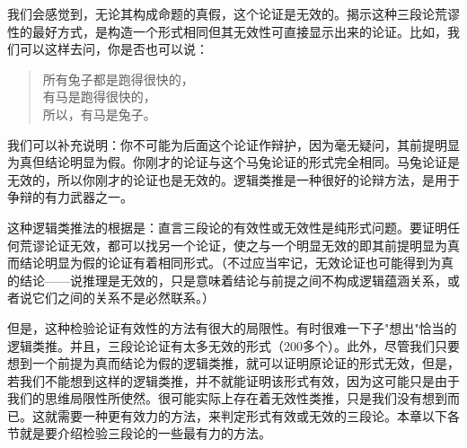 我们会感觉到，无论其构成命题的真假，这个论证是无效的。揭示这种三段论荒谬性的最好方式，是构造一个形式相同但其无效性可直接显示出来的论证。比如，我们可以这样去问，你是否也可以说：

\begin{quote}
所有兔子都是跑得很快的，\\
有马是跑得很快的，\\
所以，有马是兔子。
\end{quote}

我们可以补充说明：你不可能为后面这个论证作辩护，因为毫无疑问，其前提明显为真但结论明显为假。你刚才的论证与这个马兔论证的形式完全相同。马兔论证是无效的，所以你刚才的论证也是无效的。逻辑类推是一种很好的论辩方法，是用于争辩的有力武器之一。

这种逻辑类推法的根据是：直言三段论的有效性或无效性是纯形式问题。要证明任何荒谬论证无效，都可以找另一个论证，使之与一个明显无效的即其前提明显为真而结论明显为假的论证有着相同形式。（不过应当牢记，无效论证也可能得到为真的结论——说推理是无效的，只是意味着结论与前提之间不构成逻辑蕴涵关系，或者说它们之间的关系不是必然联系。）

但是，这种检验论证有效性的方法有很大的局限性。有时很难一下子"想出"恰当的逻辑类推。并且，三段论论证有太多无效的形式（200多个）。此外，尽管我们只要想到一个前提为真而结论为假的逻辑类推，就可以证明原论证的形式无效，但是，若我们不能想到这样的逻辑类推，并不就能证明该形式有效，因为这可能只是由于我们的思维局限性所使然。很可能实际上存在着无效性类推，只是我们没有想到而已。这就需要一种更有效力的方法，来判定形式有效或无效的三段论。本章以下各节就是要介绍检验三段论的一些最有力的方法。


\begin{center}
\end{center} 